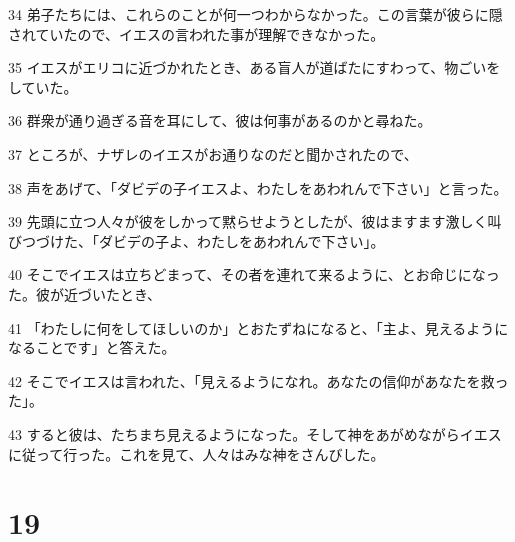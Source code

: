 \par 34 弟子たちには、これらのことが何一つわからなかった。この言葉が彼らに隠されていたので、イエスの言われた事が理解できなかった。
\par 35 イエスがエリコに近づかれたとき、ある盲人が道ばたにすわって、物ごいをしていた。
\par 36 群衆が通り過ぎる音を耳にして、彼は何事があるのかと尋ねた。
\par 37 ところが、ナザレのイエスがお通りなのだと聞かされたので、
\par 38 声をあげて、「ダビデの子イエスよ、わたしをあわれんで下さい」と言った。
\par 39 先頭に立つ人々が彼をしかって黙らせようとしたが、彼はますます激しく叫びつづけた、「ダビデの子よ、わたしをあわれんで下さい」。
\par 40 そこでイエスは立ちどまって、その者を連れて来るように、とお命じになった。彼が近づいたとき、
\par 41 「わたしに何をしてほしいのか」とおたずねになると、「主よ、見えるようになることです」と答えた。
\par 42 そこでイエスは言われた、「見えるようになれ。あなたの信仰があなたを救った」。
\par 43 すると彼は、たちまち見えるようになった。そして神をあがめながらイエスに従って行った。これを見て、人々はみな神をさんびした。

\chapter{19}

